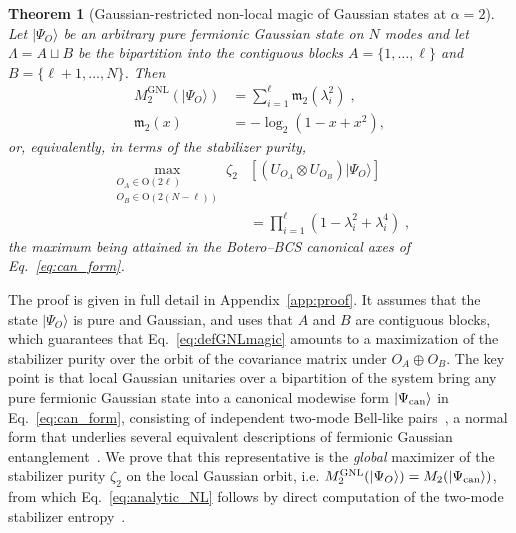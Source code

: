 \documentclass[prx,twocolumn,superscriptaddress,aps,10pt, frontmatterverbose, reprint,footinbib,longbibliography=true]{revtex4-2}
\newtheorem{theorem}{Theorem}
\newcommand{\RENYI}{\alpha}
\begin{document}
\begin{theorem}[Gaussian-restricted non-local magic of Gaussian states at $\RENYI=2$]
\label{thm:global}
Let $|\Psi_O\rangle$ be an arbitrary pure fermionic Gaussian state on $N$ modes and let $\Lambda=A\sqcup B$ be the bipartition into the contiguous blocks $A=\{1,\dots,\ell\}$ and $B=\{\ell+1,\dots,N\}$. Then
\begin{equation}
\begin{split}
    M_{2}^{\mathrm{GNL}}(|\Psi_O\rangle)&=\sum_{i=1}^{\ell}\mathfrak{m}_2(\lambda_i^2)\;,\\
    \mathfrak{m}_2(x)&=-\log_2\!\left(1-x+x^2\right),
\end{split}
    \label{eq:analytic_NL}
\end{equation}
or, equivalently, in terms of the stabilizer purity,
\begin{equation}
\begin{split}
\max_{\substack{O_A\in \mathrm{O}(2\ell)\\ O_B\in \mathrm{O}(2(N-\ell))}}\!\!\!\!\zeta_2&\left[(U_{O_A}\otimes U_{O_B})|\Psi_O\rangle\right]\\ &=\prod_{i=1}^{\ell}\left(1-\lambda_i^2+\lambda_i^4\right)\;,
\end{split}
\label{eq:thm_zeta}
\end{equation}
the maximum being attained in the Botero--BCS canonical axes of Eq.~\eqref{eq:can_form}.
\end{theorem}

The proof is given in full detail in Appendix~\ref{app:proof}. It assumes that the state $|\Psi_O\rangle$ is pure and Gaussian, and uses that $A$ and $B$ are contiguous blocks, which guarantees that Eq.~\eqref{eq:defGNLmagic} amounts to a maximization of the stabilizer purity over the orbit of the covariance matrix under $O_A\oplus O_B$.
The key point is that local Gaussian unitaries over a bipartition of the system bring any pure fermionic Gaussian state into a canonical modewise form $\ket{\Psi_{\rm can}}$ in Eq.~\eqref{eq:can_form}, consisting of independent two-mode Bell-like pairs~\cite{BoteroReznik2004}, a normal form that underlies several equivalent descriptions of fermionic Gaussian entanglement~\cite{SpeeSchwaigerGiedkeKraus2018,MorralYepesLangerGammonSmithKrausPollmann2025,langer2026matchgatecircuitrepresentationfermionic}.
We prove that this representative is the \emph{global} maximizer of the stabilizer purity $\zeta_2$ on the local Gaussian orbit, i.e.
$M_{2}^{\mathrm{GNL}}(|\Psi_O\rangle) = M_{2}(|\Psi_{\rm can}\rangle)$,
from which Eq.~\eqref{eq:analytic_NL} follows by direct computation of the two-mode stabilizer entropy~\cite{Cao_2025,qian2025quantumnonlocalnonstabilizerness}.
\end{document}

